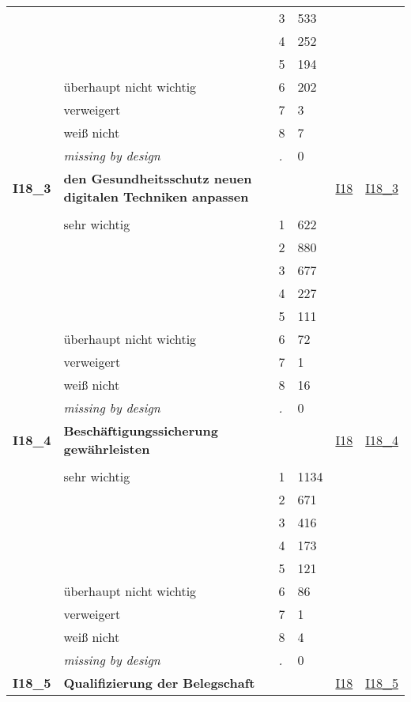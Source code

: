 \begin{longtable}{| L{2.45cm} | L{6cm} | C{1.5cm} | R{1cm} | C{2.25cm} | C{2.25cm} |}
   &  & 3 & 533 &  &  \\ 
   &  & 4 & 252 &  &  \\ 
   &  & 5 & 194 &  &  \\ 
   & überhaupt nicht wichtig & 6 & 202 &  &  \\ 
   & verweigert & 7 & 3 &  &  \\ 
   & weiß nicht & 8 & 7 &  &  \\ 
   & \textit{missing by design} & \textit{.} & 0 &  &  \\ 
   \midrule
\textbf{I18\_3}\label{var:I18:3} & \textbf{den Gesundheitsschutz neuen digitalen Techniken anpassen} &  &  & \hyperref[I18]{I18} & \hyperref[var:suf:I18:3]{I18\_3} \\ 
   &  &  &  &  &  \\ 
   & sehr wichtig & 1 & 622 &  &  \\ 
   &  & 2 & 880 &  &  \\ 
   &  & 3 & 677 &  &  \\ 
   &  & 4 & 227 &  &  \\ 
   &  & 5 & 111 &  &  \\ 
   & überhaupt nicht wichtig & 6 & 72 &  &  \\ 
   & verweigert & 7 & 1 &  &  \\ 
   & weiß nicht & 8 & 16 &  &  \\ 
   & \textit{missing by design} & \textit{.} & 0 &  &  \\ 
   \midrule
\textbf{I18\_4}\label{var:I18:4} & \textbf{Beschäftigungssicherung gewährleisten} &  &  & \hyperref[I18]{I18} & \hyperref[var:suf:I18:4]{I18\_4} \\ 
   &  &  &  &  &  \\ 
   & sehr wichtig & 1 & 1134 &  &  \\ 
   &  & 2 & 671 &  &  \\ 
   &  & 3 & 416 &  &  \\ 
   &  & 4 & 173 &  &  \\ 
   &  & 5 & 121 &  &  \\ 
   & überhaupt nicht wichtig & 6 & 86 &  &  \\ 
   & verweigert & 7 & 1 &  &  \\ 
   & weiß nicht & 8 & 4 &  &  \\ 
   & \textit{missing by design} & \textit{.} & 0 &  &  \\ 
   \midrule
\textbf{I18\_5}\label{var:I18:5} & \textbf{Qualifizierung der Belegschaft} &  &  & \hyperref[I18]{I18} & \hyperref[var:suf:I18:5]{I18\_5} \\ 

\end{longtable}
